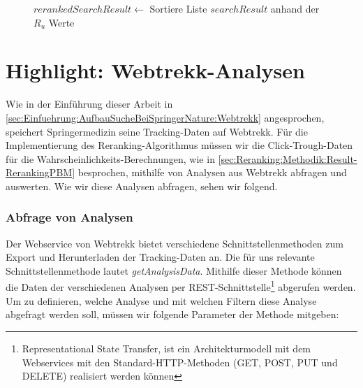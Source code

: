 \begin{figure}[H]
\begin{algorithm}[H]
{{{			\BlankLine
			$rerankedSearchResult \leftarrow$ Sortiere Liste $searchResult$ anhand der $R_{u}$ Werte\;
		}{	
		}
	}{
	}
}
\end{algorithm}
\end{figure}

\section{Highlight: Webtrekk-Analysen}
\label{sec:Implementierung:Webtrekk}

Wie in der Einführung dieser Arbeit in \ref{sec:Einfuehrung:AufbauSucheBeiSpringerNature:Webtrekk} angesprochen, speichert Springermedizin seine Tracking-Daten auf Webtrekk. Für die Implementierung des Reranking-Algorithmus müssen wir die Click-Trough-Daten für die Wahrscheinlichkeits-Berechnungen, wie in \ref{sec:Reranking:Methodik:Result-RerankingPBM} besprochen, mithilfe von Analysen aus Webtrekk abfragen und auswerten. Wie wir diese Analysen abfragen, sehen wir folgend.

\subsubsection{Abfrage von Analysen}
\label{sec:Implementierung:Webtrekk:AnalysenAbfragen}

Der Webservice von Webtrekk bietet verschiedene Schnittstellenmethoden zum Export und Herunterladen der Tracking-Daten an. Die für uns relevante Schnittstellenmethode lautet \textit{getAnalysisData}. Mithilfe dieser Methode können die Daten der verschiedenen Analysen per REST-Schnittstelle\footnote{Representational State Transfer, ist ein Architekturmodell mit dem Webservices mit den Standard-HTTP-Methoden (GET, POST, PUT und DELETE) realisiert werden können} abgerufen werden. Um zu definieren, welche Analyse und mit welchen Filtern diese Analyse abgefragt werden soll, müssen wir folgende Parameter der Methode mitgeben: 

